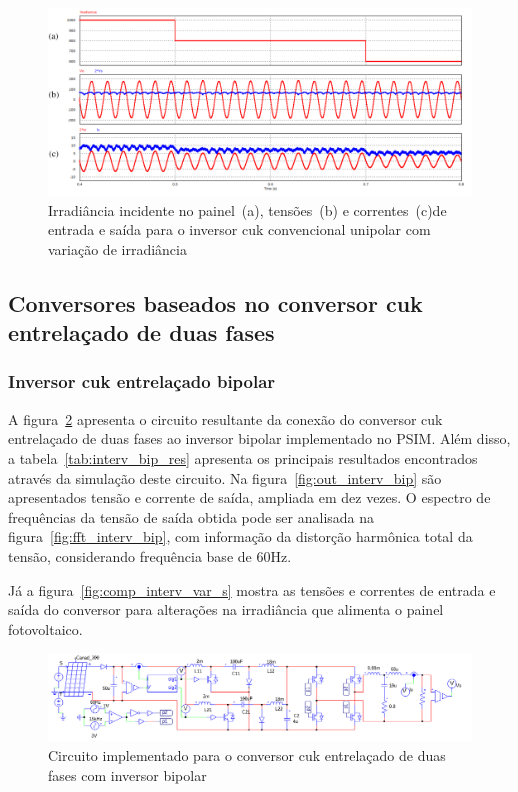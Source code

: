 \documentclass[
	12pt,				%
	openany,
	onseside,
	a4paper,			%
	english,			%
	french,				%
	spanish,			%
	brazil,				%
	]{abntex2}
\begin{document}
\begin{figure}[H]%
	\captionsetup{justification=centering}
	\centering
		\includegraphics[width= \linewidth]{comp_conv_var_s_unip}
		\caption{Irradiância incidente no painel~(a), tensões~(b) e correntes~(c)de entrada e saída para o inversor cuk convencional unipolar com variação de irradiância}
		\label{fig:comp_conv_var_s_unip}
\end{figure}

\subsection{Conversores baseados no conversor cuk entrelaçado de duas fases}

\subsubsection{Inversor cuk entrelaçado bipolar}

A figura~\ref{fig:comp_interv_circ_clean} apresenta o circuito resultante da conexão do conversor cuk entrelaçado de duas fases ao inversor bipolar implementado no PSIM. Além disso, a tabela~\ref{tab:interv_bip_res} apresenta os principais resultados encontrados através da simulação deste circuito. Na figura~\ref{fig:out_interv_bip} são apresentados tensão e corrente de saída, ampliada em dez vezes. O espectro de frequências da tensão de saída obtida pode ser analisada na figura~\ref{fig:fft_interv_bip},  com informação da distorção harmônica total da tensão, considerando frequência base de 60Hz.

Já a figura~\ref{fig:comp_interv_var_s} mostra as tensões e correntes de entrada e saída do conversor para alterações na irradiância que alimenta o painel fotovoltaico.

\begin{figure}[H]%
	\captionsetup{justification=centering}
	\centering
		\includegraphics[width= \linewidth]{comp_interv_circ_clean}
		\caption{Circuito implementado para o conversor cuk entrelaçado de duas fases com inversor bipolar}
		\label{fig:comp_interv_circ_clean}
\end{figure}
\end{document}
